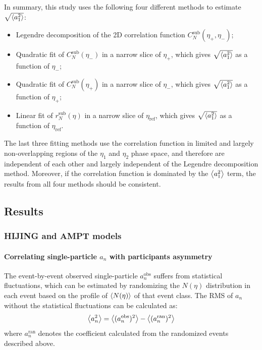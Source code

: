 In summary, this study uses the following four different methods to estimate $\sqrt{\left\langle a_1^2\right\rangle}$:
\begin{itemize}
\item Legendre decomposition of the 2D correlation function $C_N^\text{sub}(\eta_+, \eta_-)$;
\item Quadratic fit of $C_N^\text{sub}(\eta_-)$ in a narrow slice of $\eta_+$, which gives $\sqrt{\left\langle a_1^2\right\rangle}$ as a function of $\eta_-$;
\item Quadratic fit of $C_N^\text{sub}(\eta_+)$ in a narrow slice of $\eta_-$, which gives $\sqrt{\left\langle a_1^2\right\rangle}$ as a function of $\eta_+$;
\item Linear fit of $r_N^\text{sub}(\eta)$ in a narrow slice of $\eta_\text{ref}$, which gives $\sqrt{\left\langle a_1^2\right\rangle}$ as a function of $\eta_\text{ref}$.
\end{itemize}
The last three fitting methods use the correlation function in limited and largely non-overlapping regions of the $\eta_1$ and $\eta_2$ phase space, and therefore are independent of each other and largely independent of the Legendre decomposition method. Moreover, if the correlation function is dominated by the $\left\langle a_1^2\right\rangle$ term, the results from all four methods should be consistent.



\subsection{Results}

\subsubsection{HIJING and AMPT models}
\label{sec:hijing_and_ampt_models}

\paragraph{Correlating single-particle $a_n$ with participants asymmetry}

The event-by-event observed single-particle $a_n^\text{obs}$ suffers from statistical fluctuations, which can be estimated by randomizing the $N(\eta)$ distribution in each event based on the profile of $\left\langle N(\eta)\right\rangle$ of that event class. The RMS of $a_n$ without the statistical fluctuations can be calculated as:
\begin{equation}
\left\langle a_n^2\right\rangle = \left\langle (a_n^\text{obs})^2\right\rangle - \left\langle (a_n^\text{ran})^2\right\rangle
\end{equation}
where $a_n^\text{ran}$ denotes the coefficient calculated from the randomized events described above.

